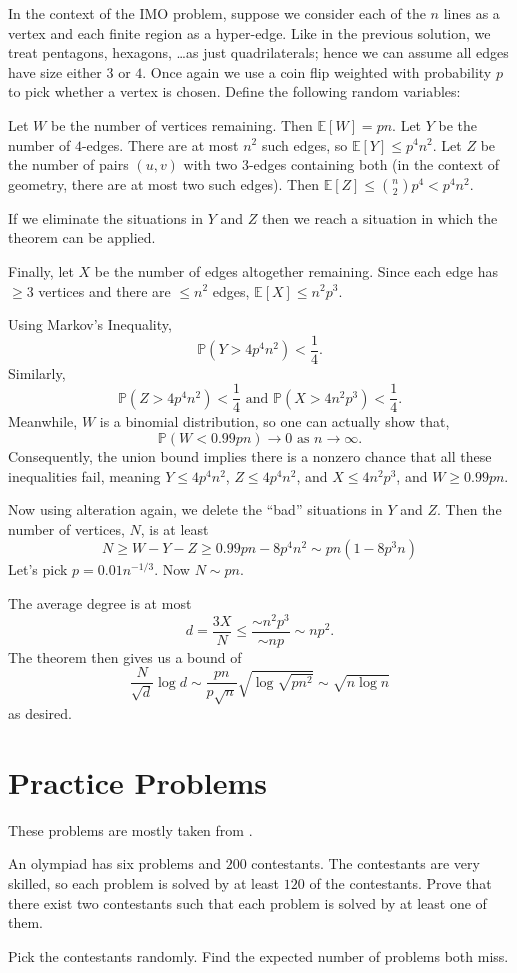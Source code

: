 \documentclass[11pt]{scrartcl}
\newcommand\EE{\mathbb E}
\newcommand\PP{\mathbb P}
\begin{document}
In the context of the IMO problem, suppose we consider each of the $n$ lines as a vertex
and each finite region as a hyper-edge.
Like in the previous solution, we treat pentagons, hexagons, \dots as just quadrilaterals;
hence we can assume all edges have size either $3$ or $4$.
Once again we use a coin flip weighted with probability $p$ to pick whether a vertex is chosen.
Define the following random variables:
\begin{itemize}
	\ii Let $W$ be the number of vertices remaining. Then $\EE[W] = pn$.
	\ii Let $Y$ be the number of $4$-edges. There are at most $n^2$ such edges, so $\EE[Y] \le p^4n^2$.
	\ii Let $Z$ be the number of pairs $(u,v)$ with two $3$-edges containing both (in the context of geometry, there are at most two such edges).
	Then $\EE[Z] \le \binom n2 p^4 < p^4n^2$.
\end{itemize}
If we eliminate the situations in $Y$ and $Z$ then we reach a situation in which the theorem can be applied.

Finally, let $X$ be the number of edges altogether remaining. Since each edge has $\ge 3$ vertices and there are $\le n^2$ edges, $\EE[X] \le n^2p^3$.

Using Markov's Inequality, \[ \PP(Y > 4p^4n^2) < \frac 14. \] Similarly, \[ \PP(Z > 4p^4n^2) < \frac 14 \text{ and } \PP(X > 4n^2p^3) < \frac 14. \]  
Meanwhile, $W$ is a binomial distribution, so one can actually show that, \[ \PP(W < 0.99pn) \to 0 \text{ as } n \to \infty. \]
Consequently, the union bound implies there is a nonzero chance that all these inequalities fail, meaning $Y \le 4p^4n^2$, $Z \le 4p^4n^2$, and $X \le 4n^2p^3$, and $W \ge 0.99pn$.

Now using alteration again, we delete the ``bad'' situations in $Y$ and $Z$.  Then the number of vertices, $N$, is at least
\[ N \ge W - Y - Z \ge 0.99 pn - 8p^4n^2 \sim pn(1-8p^3n) \] 
Let's pick $p = 0.01n^{-1/3}$.  Now $N \sim pn$.

The average degree is at most \[ d = \frac{3X}{N} \le \frac{\sim n^2p^3}{\sim np} \sim np^2. \]
The theorem then gives us a bound of
\[ \frac{N}{\sqrt{d}} \log d \sim \frac{pn}{p\sqrt n} \sqrt{\log \sqrt{pn^2}} \sim \sqrt{n \log n} \]
as desired.


\section{Practice Problems}
These problems are mostly taken from \cite{ravi,poshen}.

\begin{problem}
	[IMC 2002] An olympiad has six problems and $200$ contestants.  The contestants are very skilled,
	so each problem is solved by at least $120$ of the contestants.
	Prove that there exist two contestants such that each problem is solved by at least one of them.
	\begin{sketch}
		Pick the contestants randomly. Find the expected number of problems both miss.
	\end{sketch}
\end{problem}
\end{document}
